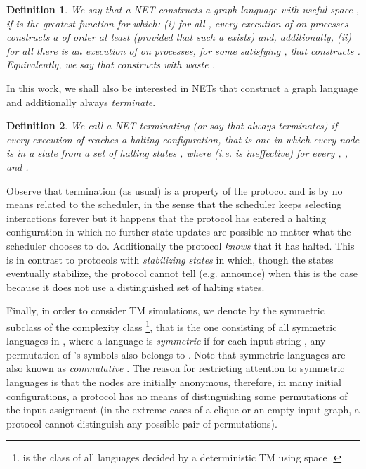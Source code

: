 \documentclass[preprint]{elsarticle}
\newtheorem{definition}{Definition}
\begin{document}
\begin{definition}
We say that a NET  \emph{constructs a graph language  with useful space }, if  is the greatest function for which: (i) for all , every execution of  on  processes constructs a  of order at least  (provided that such a  exists) and, additionally, (ii) for all  there is an execution of  on  processes, for some  satisfying , that constructs . Equivalently, we say that \emph{ constructs  with waste }.
\end{definition}

In this work, we shall also be interested in NETs that construct a graph language and additionally always \emph{terminate}. 

\begin{definition}
We call a NET  \emph{terminating} (or say that  \emph{always terminates}) if every execution of  reaches a \emph{halting} configuration, that is one in which every node is in a state  from a set of halting states , where  (i.e. is ineffective) for every , , and . 
\end{definition}

Observe that termination (as usual) is a property of the protocol and is by no means related to the scheduler, in the sense that the scheduler keeps selecting interactions forever but it happens that the protocol has entered a halting configuration in which no further state updates are possible no matter what the scheduler chooses to do. Additionally the protocol \emph{knows} that it has halted. This is in contrast to protocols with \emph{stabilizing states} \cite{CMNS13} in which, though the states eventually stabilize, the protocol cannot tell (e.g. announce) when this is the case because it does not use a distinguished set of halting states.

Finally, in order to consider TM simulations, we denote by  the symmetric subclass of the complexity class  \footnote{ is the class of all languages decided by a deterministic TM using space .}, that is the one consisting of all symmetric languages in , where a language  is \emph{symmetric} if for each input string , any permutation of 's symbols also belongs to . Note that symmetric languages are also known as \emph{commutative} \cite{FMR68}. The reason for restricting attention to symmetric languages is that the nodes are initially anonymous, therefore, in many initial configurations, a protocol has no means of distinguishing some permutations of the input assignment (in the extreme cases of a clique or an empty input graph, a protocol cannot distinguish any possible pair of permutations).   
\end{document}
